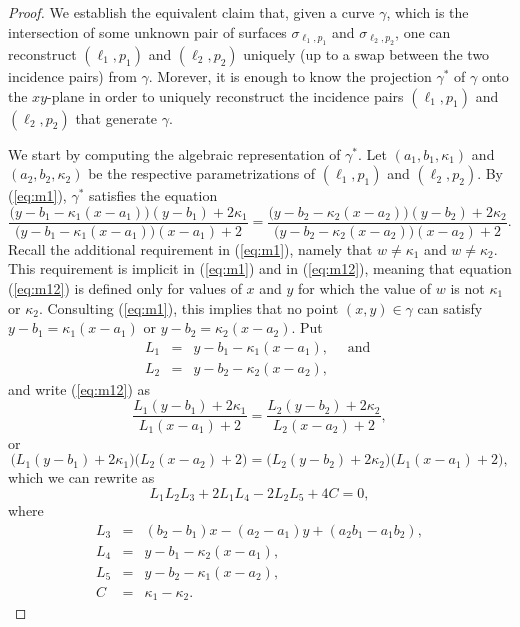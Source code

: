 \documentclass[12pt]{article}
\begin{document}
\begin{proof}
We establish the equivalent claim that, given a curve $\gamma$,
which is the intersection of some unknown pair of surfaces
$\sigma_{\ell_1,p_1}$ and $\sigma_{\ell_2,p_2}$,
one can reconstruct $(\ell_1,p_1)$ and $(\ell_2,p_2)$ uniquely
(up to a swap between the two incidence pairs) from $\gamma$.
Morever, it is enough to know the projection
$\gamma^*$ of $\gamma$ onto the $xy$-plane in order to uniquely
reconstruct the incidence pairs $(\ell_1,p_1)$ and $(\ell_2,p_2)$ that
generate $\gamma$.

We start by computing the algebraic representation of $\gamma^*$.
Let $(a_1,b_1,\kappa_1)$ and $(a_2,b_2,\kappa_2)$ be the respective
parametrizations of $(\ell_1,p_1)$ and $(\ell_2,p_2)$.
By (\ref{eq:m1}), $\gamma^*$ satisfies the equation
\begin{equation} \label{eq:m12}
\frac
{ \biggl(y-b_1-\kappa_1(x-a_1)\biggr) (y-b_1) + 2\kappa_1 }
{ \biggl(y-b_1-\kappa_1(x-a_1)\biggr) (x-a_1) + 2 } =
\frac
{ \biggl(y-b_2-\kappa_2(x-a_2)\biggr) (y-b_2) + 2\kappa_2 }
{ \biggl(y-b_2-\kappa_2(x-a_2)\biggr) (x-a_2) + 2 } .
\end{equation}
Recall the additional requirement in (\ref{eq:m1}), namely that
$w \not = \kappa_1$ and $w \not = \kappa_2$. This requirement is
implicit in (\ref{eq:m1}) and in (\ref{eq:m12}), meaning that
equation (\ref{eq:m12}) is defined only for values of $x$ and $y$
for which the value of $w$ is not $\kappa_1$ or $\kappa_2$.
Consulting (\ref{eq:m1}), this implies that no point $(x,y) \in
\gamma$ can satisfy
$y-b_1 = \kappa_1(x-a_1)$ or $y-b_2 = \kappa_2(x-a_2)$.
Put
\begin{eqnarray*}
L_1 & = & y-b_1-\kappa_1(x-a_1), \quad \mbox{ and } \\
L_2 & = & y-b_2-\kappa_2(x-a_2),
\end{eqnarray*}
and write (\ref{eq:m12}) as
$$
\frac{L_1(y-b_1) + 2\kappa_1}{L_1(x-a_1)+2} =
\frac{L_2(y-b_2) + 2\kappa_2}{L_2(x-a_2)+2} ,
$$
or
$$
\big( L_1(y-b_1) + 2\kappa_1 \big)
\big( L_2(x-a_2) + 2 \big) =
\big( L_2(y-b_2) + 2\kappa_2 \big)
\big( L_1(x-a_1) + 2 \big) ,
$$
which we can rewrite as
$$
L_1L_2L_3 + 2L_1L_4 - 2L_2L_5 + 4C = 0,
$$
where
\begin{eqnarray*}
L_3 & = & (b_2-b_1)x - (a_2-a_1)y + (a_2b_1-a_1b_2) , \\
L_4 & = & y-b_1 - \kappa_2(x-a_1) , \\
L_5 & = & y-b_2 - \kappa_1(x-a_2) , \\
C & = & \kappa_1-\kappa_2 .
\end{eqnarray*}

\end{proof}
\end{document}

